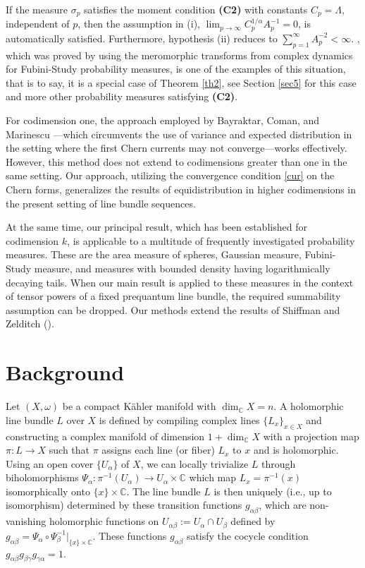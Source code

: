 \documentclass[11pt,leqno,oneside]{amsart}
\numberwithin{equation}{section}
\begin{document}
If the measure \( \sigma_{p} \) satisfies the moment condition \textbf{(C2)} with constants \( C_{p} = \Lambda \), independent of \( p \), then the assumption in (i), \( \lim_{p \to \infty} C_{p}^{1/\alpha} A_{p}^{-1} = 0 \), is automatically satisfied. Furthermore, hypothesis (ii) reduces to \( \sum_{p=1}^{\infty} A_{p}^{-2} < \infty \). \cite[Theorem 0.4]{CLMM}, which was proved by using the meromorphic transforms from complex dynamics for Fubini-Study probability measures, is one of the examples of this situation, that is to say, it is a special case of Theorem \ref{th2}, see Section \ref{sec5} for this case and more other probability measures satisfying \textbf{(C2)}.



For codimension one, the approach employed by Bayraktar, Coman, and Marinescu \cite{BCM}—which circumvents the use of variance and expected distribution in the setting where the first Chern currents may not converge—works effectively. However, this method does not extend to codimensions greater than one in the same setting. Our approach, utilizing the convergence condition \eqref{cur} on the Chern forms, generalizes the results of equidistribution in higher codimensions in the present setting of line bundle sequences.

At the same time, our principal result, which has been established for codimension $k$, is applicable to a multitude of frequently investigated probability measures. These are the area measure of spheres, Gaussian measure, Fubini-Study measure, and measures with bounded density having logarithmically decaying tails. When our main result is applied to these measures in the context of tensor powers of a fixed prequantum line bundle, the required summability assumption can be dropped. Our methods extend the results of Shiffman and Zelditch (\cite{SZ99}).



\section{Background}\label{S2}

Let \((X, \omega)\) be a compact Kähler manifold with \(\dim_{\mathbb{C}}{X}=n\).
A holomorphic line bundle \(L\) over $X$ is defined by compiling complex lines \(\{L_{x}\}_{x\in X}\)
and constructing a complex manifold of dimension \(1 + \dim_{\mathbb{C}}{X}\) with a projection map
\(\pi : L \rightarrow X \) such that \(\pi\) assigns each line (or fiber) \(L_{x}\) to \(x\) and is holomorphic.
Using an open cover \(\{U_{\alpha}\}\) of \(X\), we can locally trivialize \(L\) through biholomorphisms
\(\Psi_{\alpha}: \pi^{-1}(U_{\alpha}) \rightarrow U_{\alpha} \times \mathbb{C}\) which map \(L_{x} = \pi^{-1}(x)\)
isomorphically onto \(\{x\} \times \mathbb{C}\). The line bundle \(L\) is then uniquely (i.e., up to isomorphism)
determined by these transition functions \(g_{\alpha \beta}\), which are non-vanishing holomorphic functions
on \(U_{\alpha \beta}:=U_{\alpha} \cap U_{\beta}\) defined by \(g_{\alpha \beta}= \Psi_{\alpha} \circ \Psi^{-1}_{\beta}|_{\{x\} \times \mathbb{C}}\).
These functions \(g_{\alpha \beta}\) satisfy the cocycle condition \(g_{\alpha \beta} g_{\beta \gamma} g_{\gamma \alpha}=1\).
\end{document}
